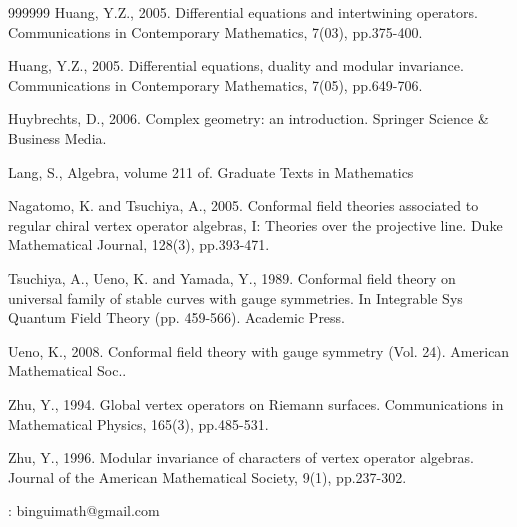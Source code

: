 \documentclass[12pt,b5paper,notitlepage]{report}
\theoremstyle{definition}
\theoremstyle{plain}
\numberwithin{equation}{section}
\begin{document}
\begin{thebibliography}{999999}
Huang, Y.Z., 2005. Differential equations and intertwining operators. Communications in Contemporary Mathematics, 7(03), pp.375-400.

Huang, Y.Z., 2005. Differential equations, duality and modular invariance. Communications in Contemporary Mathematics, 7(05), pp.649-706.

Huybrechts, D., 2006. Complex geometry: an introduction. Springer Science \& Business Media.



Lang, S., Algebra, volume 211 of. Graduate Texts in Mathematics

Nagatomo, K. and Tsuchiya, A., 2005. Conformal field theories associated to regular chiral vertex operator algebras, I: Theories over the projective line. Duke Mathematical Journal, 128(3), pp.393-471.

Tsuchiya, A., Ueno, K. and Yamada, Y., 1989. Conformal field theory on universal family of stable curves with gauge symmetries. In Integrable Sys Quantum Field Theory (pp. 459-566). Academic Press.

Ueno, K., 2008. Conformal field theory with gauge symmetry (Vol. 24). American Mathematical Soc..

Zhu, Y., 1994. Global vertex operators on Riemann surfaces. Communications in Mathematical Physics, 165(3), pp.485-531.

Zhu, Y., 1996. Modular invariance of characters of vertex operator algebras. Journal of the American Mathematical Society, 9(1), pp.237-302.


	

	
\end{thebibliography}

: binguimath@gmail.com
\end{document}
